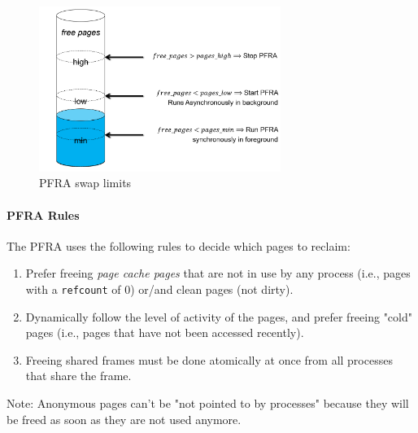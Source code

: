 \documentclass[openany,12pt]{book}
\newcommand{\code}[1]{\texttt{#1}}
\begin{document}
\begin{figure}[H]
  \centering
  \includegraphics[width=0.7\textwidth]{PFRA.png}
  \caption{PFRA swap limits}
  \label{fig:PFRA}
\end{figure}



\paragraph{PFRA Rules} The PFRA uses the following rules to decide which pages to reclaim:
\begin{enumerate}
  \item Prefer freeing \textit{page cache pages} that are not in use by any process (i.e., pages with a \code{refcount} of 0) or/and clean pages (not dirty).

  \item Dynamically follow the level of activity of the pages, and prefer freeing "cold" pages (i.e., pages that have not been accessed recently).

  \item Freeing shared frames must be done atomically at once from all processes that share the frame.
\end{enumerate}

Note: Anonymous pages can't be "not pointed to by processes" because they will be freed as soon as they are not used anymore.
\end{document}
